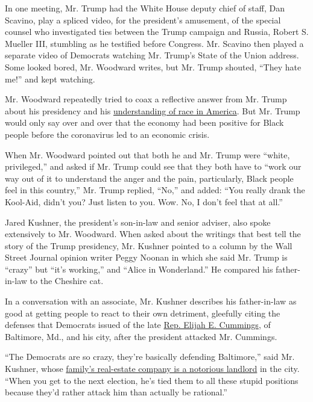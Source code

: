 In one meeting, Mr. Trump had the White House deputy chief of staff, Dan
Scavino, play a spliced video, for the president's amusement, of the
special counsel who investigated ties between the Trump campaign and
Russia, Robert S. Mueller III, stumbling as he testified before
Congress. Mr. Scavino then played a separate video of Democrats watching
Mr. Trump's State of the Union address. Some looked bored, Mr. Woodward
writes, but Mr. Trump shouted, ``They hate me!'' and kept watching.

Mr. Woodward repeatedly tried to coax a reflective answer from Mr. Trump
about his presidency and his
\href{https://www.nytimes3xbfgragh.onion/2020/09/06/us/politics/trump-race-2020-election.html}{understanding
of race in America}. But Mr. Trump would only say over and over that the
economy had been positive for Black people before the coronavirus led to
an economic crisis.

When Mr. Woodward pointed out that both he and Mr. Trump were ``white,
privileged,'' and asked if Mr. Trump could see that they both have to
``work our way out of it to understand the anger and the pain,
particularly, Black people feel in this country,'' Mr. Trump replied,
``No,'' and added: ``You really drank the Kool-Aid, didn't you? Just
listen to you. Wow. No, I don't feel that at all.''

Jared Kushner, the president's son-in-law and senior adviser, also spoke
extensively to Mr. Woodward. When asked about the writings that best
tell the story of the Trump presidency, Mr. Kushner pointed to a column
by the Wall Street Journal opinion writer Peggy Noonan in which she said
Mr. Trump is ``crazy'' but ``it's working,'' and ``Alice in
Wonderland.'' He compared his father-in-law to the Cheshire cat.

In a conversation with an associate, Mr. Kushner describes his
father-in-law as good at getting people to react to their own detriment,
gleefully citing the defenses that Democrats issued of the late
\href{https://www.nytimes3xbfgragh.onion/2019/10/17/us/politics/elijah-cummings-death-illness.html}{Rep.
Elijah E. Cummings}, of Baltimore, Md., and his city, after the
president attacked Mr. Cummings.

``The Democrats are so crazy, they're basically defending Baltimore,''
said Mr. Kushner, whose
\href{https://www.nytimes3xbfgragh.onion/2017/05/23/magazine/jared-kushners-other-real-estate-empire.html}{family's
real-estate company is a notorious landlord} in the city. ``When you get
to the next election, he's tied them to all these stupid positions
because they'd rather attack him than actually be rational.''


